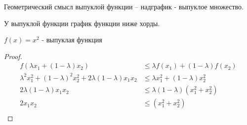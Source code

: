 \quad

\begin{remark}
    Геометрический смысл выпуклой функции -- надграфик - выпуклое множество.
\end{remark}

\begin{remark}
    У выпуклой функции график функции ниже хорды.
\end{remark}

\begin{example}
    $f(x) = x ^ 2$ - выпуклая функция
\end{example}

\begin{proof}
\begin{equation*}
\begin{aligned}
    f(\lambda x_1 + (1-\lambda) x_2) &\leqslant \lambda f(x_1) + (1 - \lambda) f(x_2) \\
    \lambda ^ 2 x_1 ^ 2 + (1 - \lambda) ^ 2 x_2 ^ 2 + 2 \lambda (1 - \lambda) x_1 x_2 &\leqslant \lambda x_1^2 + (1 - \lambda) x_2^2 \\
    2 \lambda (1 - \lambda) x_1 x_2 &\leqslant \lambda (1 - \lambda)  (x_1^2 +  x_2^2) \\
    2 x_1 x_2 &\leqslant (x_1^2 +  x_2^2) \\
\end{aligned}
\end{equation*}
\end{proof}



